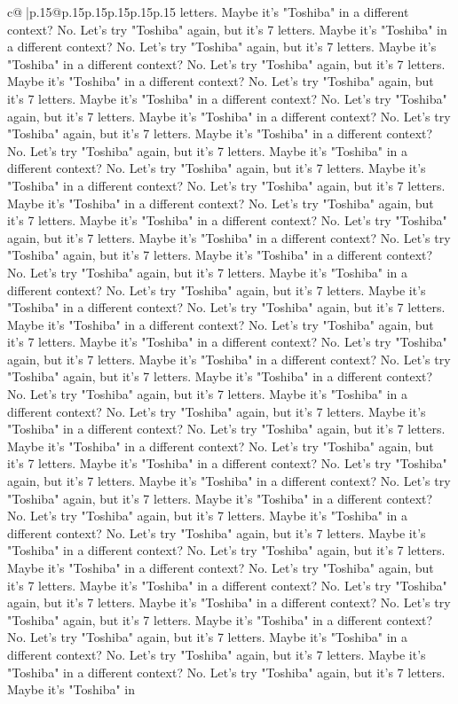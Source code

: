 \documentclass{article}
\begin{document}
{\begin{supertabular}{c@{$\;$}|p{.15\linewidth}@{}p{.15\linewidth}p{.15\linewidth}p{.15\linewidth}p{.15\linewidth}p{.15\linewidth}}
{{{letters. Maybe it's "Toshiba" in a different context? No. Let's try "Toshiba" again, but it's 7 letters. Maybe it's "Toshiba" in a different context? No. Let's try "Toshiba" again, but it's 7 letters. Maybe it's "Toshiba" in a different context? No. Let's try "Toshiba" again, but it's 7 letters. Maybe it's "Toshiba" in a different context? No. Let's try "Toshiba" again, but it's 7 letters. Maybe it's "Toshiba" in a different context? No. Let's try "Toshiba" again, but it's 7 letters. Maybe it's "Toshiba" in a different context? No. Let's try "Toshiba" again, but it's 7 letters. Maybe it's "Toshiba" in a different context? No. Let's try "Toshiba" again, but it's 7 letters. Maybe it's "Toshiba" in a different context? No. Let's try "Toshiba" again, but it's 7 letters. Maybe it's "Toshiba" in a different context? No. Let's try "Toshiba" again, but it's 7 letters. Maybe it's "Toshiba" in a different context? No. Let's try "Toshiba" again, but it's 7 letters. Maybe it's "Toshiba" in a different context? No. Let's try "Toshiba" again, but it's 7 letters. Maybe it's "Toshiba" in a different context? No. Let's try "Toshiba" again, but it's 7 letters. Maybe it's "Toshiba" in a different context? No. Let's try "Toshiba" again, but it's 7 letters. Maybe it's "Toshiba" in a different context? No. Let's try "Toshiba" again, but it's 7 letters. Maybe it's "Toshiba" in a different context? No. Let's try "Toshiba" again, but it's 7 letters. Maybe it's "Toshiba" in a different context? No. Let's try "Toshiba" again, but it's 7 letters. Maybe it's "Toshiba" in a different context? No. Let's try "Toshiba" again, but it's 7 letters. Maybe it's "Toshiba" in a different context? No. Let's try "Toshiba" again, but it's 7 letters. Maybe it's "Toshiba" in a different context? No. Let's try "Toshiba" again, but it's 7 letters. Maybe it's "Toshiba" in a different context? No. Let's try "Toshiba" again, but it's 7 letters. Maybe it's "Toshiba" in a different context? No. Let's try "Toshiba" again, but it's 7 letters. Maybe it's "Toshiba" in a different context? No. Let's try "Toshiba" again, but it's 7 letters. Maybe it's "Toshiba" in a different context? No. Let's try "Toshiba" again, but it's 7 letters. Maybe it's "Toshiba" in a different context? No. Let's try "Toshiba" again, but it's 7 letters. Maybe it's "Toshiba" in a different context? No. Let's try "Toshiba" again, but it's 7 letters. Maybe it's "Toshiba" in a different context? No. Let's try "Toshiba" again, but it's 7 letters. Maybe it's "Toshiba" in a different context? No. Let's try "Toshiba" again, but it's 7 letters. Maybe it's "Toshiba" in a different context? No. Let's try "Toshiba" again, but it's 7 letters. Maybe it's "Toshiba" in a different context? No. Let's try "Toshiba" again, but it's 7 letters. Maybe it's "Toshiba" in a different context? No. Let's try "Toshiba" again, but it's 7 letters. Maybe it's "Toshiba" in a different context? No. Let's try "Toshiba" again, but it's 7 letters. Maybe it's "Toshiba" in a different context? No. Let's try "Toshiba" again, but it's 7 letters. Maybe it's "Toshiba" in a different context? No. Let's try "Toshiba" again, but it's 7 letters. Maybe it's "Toshiba" in }}}
\end{supertabular}}
\end{document}
